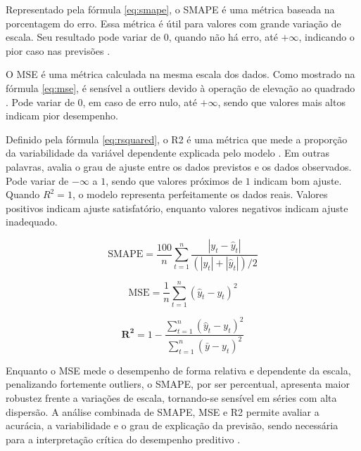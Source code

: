 \documentclass[12pt]{tcc}
\begin{document}
Representado pela fórmula \ref{eq:smape}, o \acrfull{SMAPE} é uma métrica baseada na porcentagem do erro. Essa métrica é útil para valores com grande variação de escala. Seu resultado pode variar de \( 0 \), quando não há erro, até \( +\infty \), indicando o pior caso nas previsões \citep{ogasawara_event_2025}.

O \acrfull{MSE} é uma métrica calculada na mesma escala dos dados. Como mostrado na fórmula \ref{eq:mse}, é sensível a outliers devido à operação de elevação ao quadrado \citep{chen_new_2017}. Pode variar de \( 0 \), em caso de erro nulo, até \( +\infty \), sendo que valores mais altos indicam pior desempenho.

Definido pela fórmula \ref{eq:rsquared}, o \acrfull{R2} é uma métrica que mede a proporção da variabilidade da variável dependente explicada pelo modelo \citep{chicco_coefficient_2021}. Em outras palavras, avalia o grau de ajuste entre os dados previstos e os dados observados. Pode variar de \( -\infty \) a \( 1 \), sendo que valores próximos de \( 1 \) indicam bom ajuste. Quando ${R^2} = 1$, o modelo representa perfeitamente os dados reais. Valores positivos indicam ajuste satisfatório, enquanto valores negativos indicam ajuste inadequado.

\begin{equation}
\text{SMAPE} = \frac{100}{n} \sum_{t=1}^{n} \frac{\left| y_t - \hat{y}_t \right|}{(\left| y_t \right| + \left| \hat{y}_t \right|)/2}
\label{eq:smape}
\end{equation}

\begin{equation}
\text{MSE} = \frac{1}{n} \sum_{t=1}^{n} (\hat{y}_t - y_t)^2
\label{eq:mse}
\end{equation}

\begin{equation}
\boldsymbol{R^2} = 1 - \frac{\sum_{t=1}^{n} (\hat{y}_t - y_t)^2}{\sum_{t=1}^{n} (\bar{y} - y_t)^2}
\label{eq:rsquared}
\end{equation}

Enquanto o \gls{MSE} mede o desempenho de forma relativa e dependente da escala, penalizando fortemente outliers, o \gls{SMAPE}, por ser percentual, apresenta maior robustez frente a variações de escala, tornando-se sensível em séries com alta dispersão. A análise combinada de \gls{SMAPE}, \gls{MSE} e \gls{R2} permite avaliar a acurácia, a variabilidade e o grau de explicação da previsão, sendo necessária para a interpretação crítica do desempenho preditivo \citep{hyndman_forecasting_2018}.
\end{document}

